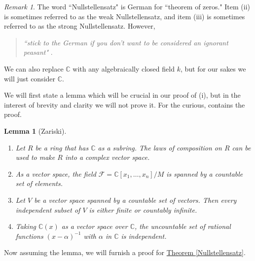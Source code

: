\documentclass[letterpaper]{article}
\newtheorem{lemma}[theorem]{Lemma}
\theoremstyle{definition}
\theoremstyle{remark}
\newtheorem{remark}[theorem]{Remark}
\newcommand\CC{\mathbb{C}}
\begin{document}
\begin{remark}
    The word ``Nullstellensatz" is German for ``theorem of zeros." Item (ii) is sometimes referred to as the weak Nullstellensatz, and item (iii) is sometimes referred to as the strong Nullstellensatz. However,
    \begin{quote}
        \textit{``stick to the German if you don't want to be considered an ignorant peasant"} \cite{reid}. 
    \end{quote}
	We can also replace \(\CC{}\) with any algebraically closed field \(k\), but for our sakes we will just consider \(\CC\). 
\end{remark}

We will first state a lemma which will be crucial in our proof of (i), but in the interest of brevity and clarity we will not prove it. For the curious, \cite{artin} contains the proof. 
\begin{lemma}[Zariski]\label{Zariski} $~$
			\begin{enumerate}[label=(\roman*)]
				\item Let \(R\) be a ring that has \(\CC{}\) as a subring. The laws of composition on \(R\) can be used to make \(R\) into a complex vector space. 
				\item As a vector space, the field \(\mathcal F=\CC[x_1,\dots,x_n]/M\) is spanned by a countable set of elements. 
				\item Let \(V\) be a vector space spanned by a countable set of vectors. Then every independent subset of \(V\) is either finite or countably infinite. 
				\item Taking \(\CC(x)\) as a vector space over \(\CC{}\), the uncountable set of rational functions \((x-\alpha)^{-1}\) with \(\alpha\) in \(\CC\) is independent. 
			\end{enumerate}
		\end{lemma}
Now assuming the lemma, we will furnish a proof for \hyperref[Nullstellensatz]{Theorem \ref*{Nullstellensatz}}.
\end{document}
